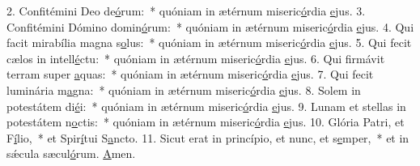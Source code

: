 2. Confitémini Deo de\uline{ó}rum:~* quóniam in ætérnum miseric\uline{ó}rdia \uline{e}jus.
3. Confitémini Dómino domin\uline{ó}rum:~* quóniam in ætérnum miseric\uline{ó}rdia \uline{e}jus.
4. Qui facit mirabília magna s\uline{o}lus:~* quóniam in ætérnum miseric\uline{ó}rdia \uline{e}jus.
5. Qui fecit cælos in intell\uline{é}ctu:~* quóniam in ætérnum miseric\uline{ó}rdia \uline{e}jus.
6. Qui firmávit terram super \uline{a}quas:~* quóniam in ætérnum miseric\uline{ó}rdia \uline{e}jus.
7. Qui fecit luminária m\uline{a}gna:~* quóniam in ætérnum miseric\uline{ó}rdia \uline{e}jus.
8. Solem in potestátem di\uline{é}i:~* quóniam in ætérnum miseric\uline{ó}rdia \uline{e}jus.
9. Lunam et stellas in potestátem n\uline{o}ctis:~* quóniam in ætérnum miseric\uline{ó}rdia \uline{e}jus.
10. Glória Patri, et F\uline{í}lio,~* et Spir\uline{í}tui S\uline{a}ncto.
11. Sicut erat in princípio, et nunc, et s\uline{e}mper,~* et in sǽcula sæcul\uline{ó}rum. \uline{A}men.
